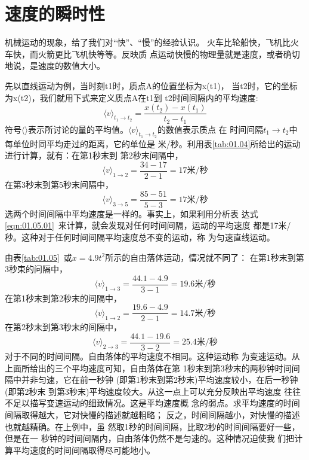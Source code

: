 \section{速度的瞬时性}\label{sec:01.06}

机械运动的现象，给了我们对“快”、“慢”的经验认识。
火车比轮船快，飞机比火车快，而火箭更比飞机快等等。反映质
点运动快慢的物理量就是速度，或者确切地说，是速度的数值大小。

先以直线运动为例，当时刻t1时，质点A的位置坐标为x(t1)，
当t2时，它的坐标为x(t2)，我们就用下式来定义质点A在t1到
t2时间间隔内的平均速度:
\begin{equation}
    \langle v\rangle_{t_{1} \rightarrow t_{2}}=\frac{x(t_{2})-x(t_{1})}{t_{2}-t_{1}} \label{eqn:01.06.01}
\end{equation}
符号$\langle \rangle$表示所讨论的量的平均值。$\langle v\rangle_{t_{1} \rightarrow t_{2}}$的数值表示质点
在
\clearpage
\noindent 时间间隔$t_{1} \rightarrow t_{2}$中每单位时同平均走过的距离，它的单位是
米/秒。利用表\ref{tab:01.04}所给出的运动进行计算，就有：在第1秒末到
第2秒末间隔中，
\begin{equation*}
    \langle v\rangle_{1 \rightarrow 2}=\frac{34-17}{2-1}=17\text{米/秒}
\end{equation*}
在第3秒末到第5秒末间隔中，
\begin{equation*}
    \langle v\rangle_{3 \rightarrow 5}=\frac{85-51}{5-3}=17\text{米/秒}
\end{equation*}
选两个时间间隔中平均速度是一样的。事实上，如果利用分析表
达式\eqref{eqn:01.05.01}~来计算，就会发现对任何时间间隔，运动的平均速度
都是17米/秒。这种对于任何时间间隔平均速度总不变的运动，称
为匀速直线运动。

由表\ref{tab:01.05}~或$x=4.9t^2$所示的自由落体运动，情况就不同了：
在第1秒末到第3秒束的问隔中，
\begin{equation*}
    \langle v\rangle_{1 \rightarrow 3}=\frac{44.1-4.9}{3-1}=19.6\text{米/秒}
\end{equation*}
在第1秒末到第2秒末的间隔中，
\begin{equation*}
    \langle v\rangle_{1 \rightarrow 2}=\frac{19.6-4.9}{2-1}=14.7\text{米/秒}
\end{equation*}
在第2秒末到第3秒末的间隔中，
\begin{equation*}
    \langle v\rangle_{2 \rightarrow 3}=\frac{44.1-19.6}{3-2}=25.4\text{米/秒}
\end{equation*}
对于不同的时间间隔。自由落体的平均速度不相同。这种运动称
为变速运动。从上面所给出的三个平均速度可知，自由落体在第
1秒末到第3秒末的两秒钟时间间隔中并非匀速，它在前一秒钟
(即第1秒末到第2秒末)平均速度较小，在后一秒钟(即第2秒末
到第3秒末)平均速度较大。从这一点上可以充分反映出平均速度
往往不足以描写变速运动的细致情况。这是平均速度概
念的弱点。求平均速度的时间间隔取得越大，它对快慢的描述就越粗略；
反之，时间间隔越小，对快慢的描述也就越精确。在上例中，虽
然取1秒的时间间隔，比取2秒的时间间隔要好一些，但是在一
秒钟的时间间隔内，自由落体仍然不是匀速的。这种情况迫使我
们把计算平均速度的时间间隔取得尽可能地小。

